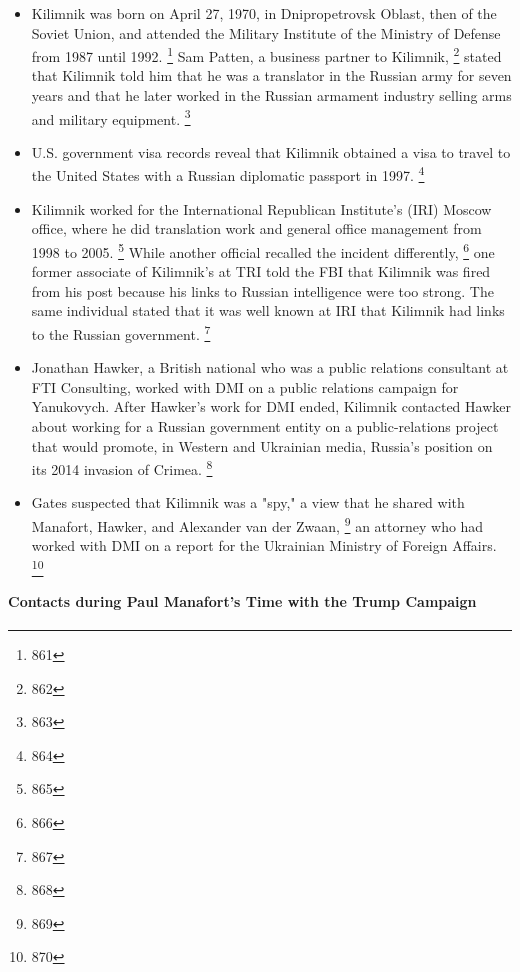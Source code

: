 \begin{itemize}

    \item Kilimnik was born on April 27, 1970, in Dnipropetrovsk Oblast, then of the Soviet Union, and attended the Military Institute of the Ministry of Defense from 1987 until 1992.%
\footnote{861}
    Sam Patten, a business partner to Kilimnik,%
\footnote{862}
    stated that Kilimnik told him that he was a translator in the Russian army for seven years and that he later worked in the Russian armament industry selling arms and military equipment.%
\footnote{863}

    \item U.S. government visa records reveal that Kilimnik obtained a visa to travel to the United States with a Russian diplomatic passport in 1997.%
\footnote{864}

    \item Kilimnik worked for the International Republican Institute's (IRI) Moscow office, where he did translation work and general office management from 1998 to 2005.%
\footnote{865}
    While another official recalled the incident differently,%
\footnote{866}
    one former associate of Kilimnik's at TRI told the FBI that Kilimnik was fired from his post because his links to Russian intelligence were too strong.
    The same individual stated that it was well known at IRI that Kilimnik had links to the Russian government.%
\footnote{867}

    \item Jonathan Hawker, a British national who was a public relations consultant at FTI Consulting, worked with DMI on a public relations campaign for Yanukovych.
    After Hawker's work for DMI ended, Kilimnik contacted Hawker about working for a Russian government entity on a public-relations project that would promote, in Western and Ukrainian media, Russia's position on its 2014 invasion of Crimea.%
\footnote{868}

    \item Gates suspected that Kilimnik was a "spy," a view that he shared with Manafort, Hawker, and Alexander van der Zwaan,%
\footnote{869}
    an attorney who had worked with DMI on a report for the Ukrainian Ministry of Foreign Affairs.%
\footnote{870}
\end{itemize}


\paragraph{Contacts during Paul Manafort's Time with the Trump Campaign}


